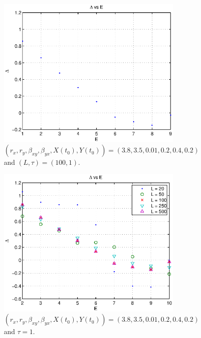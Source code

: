 \documentclass[a4paper,11pt]{article}
\begin{document}
\begin{figure}[h!t]
\centering
\begin{subfigure}[b]{0.4\textwidth}
\label{fig:SugDeltavE}
\includegraphics[scale=0.55]{SugDeltavE.eps}
\caption{$\left(r_x,r_y,\beta_{xy},\beta_{yx},X(t_0),Y(t_0)\right) = \left(3.8,3.5,0.01,0.2,0.4,0.2\right)$ and $\left(L,\tau\right) = \left(100,1\right)$.}
\end{subfigure}
\begin{subfigure}[b]{0.4\textwidth}
\label{fig:SugDeltavEandL}
\includegraphics[scale=0.55]{SugDeltavEandL.eps}
\caption{$\left(r_x,r_y,\beta_{xy},\beta_{yx},X(t_0),Y(t_0)\right) = \left(3.8,3.5,0.01,0.2,0.4,0.2\right)$ and $ \tau = 1$.}
\end{subfigure}
\caption{}
\end{figure}
\end{document}
